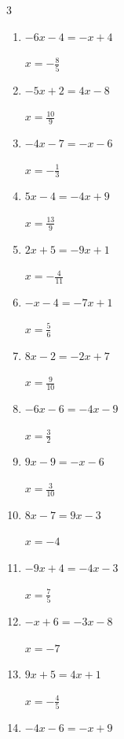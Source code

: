 \begin{multicols}{3}
\begin{enumerate}
        $\displaystyle x=\frac{1}{3}$

  \item $-6x-4=-x+4$

        $\displaystyle x=-\frac{8}{5}$

  \item $-5x+2=4x-8$

        $\displaystyle x=\frac{10}{9}$

  \item $-4x-7=-x-6$

        $\displaystyle x=-\frac{1}{3}$

  \item $5x-4=-4x+9$

        $\displaystyle x=\frac{13}{9}$

  \item $2x+5=-9x+1$

        $\displaystyle x=-\frac{4}{11}$

  \item $-x-4=-7x+1$

        $\displaystyle x=\frac{5}{6}$

  \item $8x-2=-2x+7$

        $\displaystyle x=\frac{9}{10}$

  \item $-6x-6=-4x-9$

        $\displaystyle x=\frac{3}{2}$

  \item $9x-9=-x-6$

        $\displaystyle x=\frac{3}{10}$

  \item $8x-7=9x-3$

        $\displaystyle x=-4$

\columnbreak %

\resetques

  \item $-9x+4=-4x-3$

        $\displaystyle x=\frac{7}{5}$

  \item $-x+6=-3x-8$

        $\displaystyle x=-7$

  \item $9x+5=4x+1$

        $\displaystyle x=-\frac{4}{5}$

  \item $-4x-6=-x+9$


\end{enumerate}
\end{multicols}
